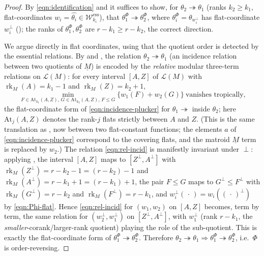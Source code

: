 \documentclass{article}
\theoremstyle{definition}
\newcommand{\rk}{\operatorname{rk}}
\newcommand{\onto}{\twoheadrightarrow}
\newcommand{\cLL}{\mathcal{L}}
\newcommand{\cW}{\mathcal{W}}
\begin{document}
\begin{proof}
By \eqref{eqn:identification} and  it suffices to show, for $\theta_2\onto
\theta_1$ (ranks $k_2\ge k_1$, flat-coordinates $w_i=\widehat{\theta_i}\in\cW^{\mathrm{ess}}_{k_i}$),
that $\theta_1^{\Phi}\onto\theta_2^{\Phi}$, where $\theta_i^{\Phi}=\theta_{w_i^{\perp}}$ has
flat-coordinate $w_i^{\perp}$ (); the ranks of $\theta_1^{\Phi},\theta_2^{\Phi}$ are
$r-k_1\ge r-k_2$, the correct direction.

We argue directly in flat coordinates, using that the quotient order is detected by the essential
relations. By  and , the relation
$\theta_2\onto\theta_1$ (an incidence relation between two quotients of $\underline M$) is encoded by
the \emph{relative} modular three-term relations on $\cLL(M)$: for every interval $[A,Z]$ of
$\cLL(M)$ with $\rk_M(A)=k_1-1$ and $\rk_M(Z)=k_2+1$,
\begin{equation}\label{eqn:rel-incid}
  \min_{F\in\mathrm{At}_{k_1}(A,Z),\,G\in\mathrm{At}_{k_2}(A,Z),\,F\le G}\bigl\{w_1(F)+w_2(G)\bigr\}
  \ \text{vanishes tropically,}
\end{equation}
the flat-coordinate form of \eqref{eqn:incidence-plucker} for $\theta_1\onto$ inside $\theta_2$;
here $\mathrm{At}_{j}(A,Z)$ denotes the rank-$j$ flats strictly between $A$ and $Z$. (This is the
same translation as , now between two flat-constant functions; the elements
$a$ of \eqref{eqn:incidence-plucker} correspond to the covering flats, and the matroid $\underline M$
term is replaced by $w_2$.) The relation \eqref{eqn:rel-incid} is manifestly invariant under $\perp$:
applying , the interval $[A,Z]$ maps to $[Z^{\perp},A^{\perp}]$ with
$\rk_M(Z^{\perp})=r-k_2-1=(r-k_2)-1$ and $\rk_M(A^{\perp})=r-k_1+1=(r-k_1)+1$, the pair
$F\le G$ maps to $G^{\perp}\le F^{\perp}$ with $\rk_M(G^{\perp})=r-k_2$ and
$\rk_M(F^{\perp})=r-k_1$, and $w_i^{\perp}(\,\cdot\,)=w_i((\,\cdot\,)^{\perp})$ by
\eqref{eqn:Phi-flat}. Hence \eqref{eqn:rel-incid} for $(w_1,w_2)$ on $[A,Z]$ becomes, term by term,
the same relation for $(w_2^{\perp},w_1^{\perp})$ on $[Z^{\perp},A^{\perp}]$, with $w_1^{\perp}$
(rank $r-k_1$, the \emph{smaller}-corank/larger-rank quotient) playing the role of the sub-quotient.
This is exactly the flat-coordinate form of $\theta_1^{\Phi}\onto\theta_2^{\Phi}$. Therefore
$\theta_2\onto\theta_1\Rightarrow\theta_1^{\Phi}\onto\theta_2^{\Phi}$, i.e.\ $\Phi$ is
order-reversing.
\end{proof}
\end{document}
